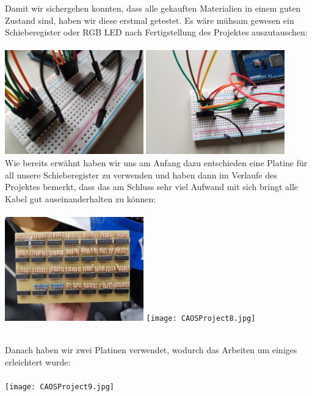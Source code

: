 \documentclass[12pt,a4paper]{article}
\begin{document}
Damit wir sichergehen konnten, dass alle gekauften Materialien in einem guten Zustand sind, haben wir diese erstmal 
getestet. Es wäre mühsam gewesen ein Schieberegister oder RGB LED nach Fertigstellung des Projektes auszutauschen: \\\\
\includegraphics[width=0.45\textwidth]{CAOSProject3.jpg}
\includegraphics[width=0.45\textwidth]{CAOSProject5.jpg} \\

Wie bereits erwähnt haben wir uns am Anfang dazu entschieden eine Platine für all unsere Schieberegister zu verwenden 
und haben dann im Verlaufe des Projektes bemerkt, dass das am Schluss sehr viel Aufwand mit sich bringt alle Kabel gut
auseinanderhalten zu können: \\\\
\includegraphics[width=0.45\textwidth]{CAOSProject7.jpg}
\texttt{[image: CAOSProject8.jpg]} \\\\
\newpage

Danach haben wir zwei Platinen verwendet, wodurch das Arbeiten um einiges erleichtert wurde: \\\\
\texttt{[image: CAOSProject9.jpg]} \\\\
\end{document}
